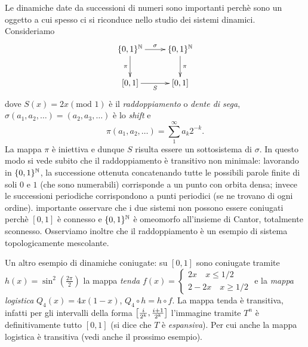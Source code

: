 \begin{esempio} Le dinamiche date da successioni di numeri sono importanti perchè sono un oggetto a cui 
spesso ci si riconduce nello studio dei sistemi dinamici. Consideriamo
\[ \xymatrix{ \{0,1\}^\N \ar[r]^\sigma \ar[d]_\pi & \{0,1\}^\N \ar[d]^\pi \\ [0,1] \ar[r]_S & [0,1] } \]
 dove $S(x)=2x(\mbox{mod } 1)$ è il \emph{raddoppiamento} o \emph{dente di sega}, $\sigma(a_1,a_2,\dots)=(a_2,a_3,\dots)$ è lo \emph{shift} e 
 \[\pi(a_1,a_2,\dots)=\sum_1^\infty a_k 2^{-k}.\]
 La mappa $\pi$ è iniettiva e dunque $S$ risulta essere un sottosistema di $\sigma$. In questo modo si vede subito che il raddoppiamento è transitivo non minimale: 
 lavorando in $\{0,1\}^{\mathbb{N}}$, la successione ottenuta concatenando tutte le possibili parole finite di soli $0$ e $1$ (che sono numerabili) corrisponde a un punto con orbita densa; 
 invece le successioni periodiche corrispondono a punti periodici (se ne trovano di ogni ordine). 
 \Eacc importante osservare che i due sistemi non possono essere coniugati perchè $[0,1]$ è connesso e $\{0,1\}^{\mathbb{N}}$ è omeomorfo all'insieme di Cantor, 
 totalmente sconnesso. \newline
 Osserviamo inoltre che il raddoppiamento è un esempio di sistema topologicamente mescolante.
\end{esempio}



\begin{esempio} Un altro esempio di dinamiche coniugate: 
su $[0,1]$ sono coniugate tramite $h(x)=\sin^2\left(\frac{2\pi}{2}\right)$ la mappa \emph{tenda} 
$f(x)=\begin{cases}2x \quad x\leq 1/2 \\ 2-2x \quad x\geq 1/2\end{cases}$ e la \emph{mappa logistica} $Q_4(x)=4x(1-x)$, $Q_4\circ h=h\circ f$.
La mappa tenda è transitiva, infatti per gli intervalli della forma $\left[\frac{i}{2^k},\frac{i+1}{2^k}\right]$ l'immagine
tramite $T^n$ è definitivamente tutto $[0,1]$ (si dice che $T$ è \emph{espansiva}). Per cui anche la mappa logistica è transitiva (vedi anche il prossimo esempio).
\end{esempio}



